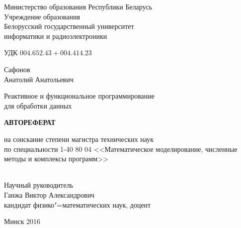 \begin{titlepage}
  \begin{center}
    Министерство образования Республики Беларусь\\[1em]
    Учреждение образования\\
    Белорусский государственный университет \\
    информатики и радиоэлектроники \\[2em]

    \begin{flushleft}
        УДК $004.652.43+004.414.23$ \\[2cm]
    \end{flushleft}

    \begin{center}
      Сафонов \\ Анатолий Анатольевич\\[3em]
    \end{center}

    {\centering Реактивное и функциональное программирование \\ для обработки данных \\[3em]}


    {\centering\textbf{АВТОРЕФЕРАТ}}\\[2em]

    \begin{center}
      на соискание степени магистра технических наук \\ по специальности 1-40 80 04 <<Математическое моделирование, численные методы и комплексы программ>>\\[3em]
    \end{center}

    \begin{flushright}
      \underline{\hspace*{7.5cm}} \\[1cm]
      Научный руководитель \\
      Ганжа Виктор Александрович \\
      кандидат физико"=математических наук, доцент \\[1cm]
      \underline{\hspace*{7.5cm}}
    \end{flushright}

    \vfill
    {\normalsize Минск 2016}
  \end{center}
\end{titlepage}
